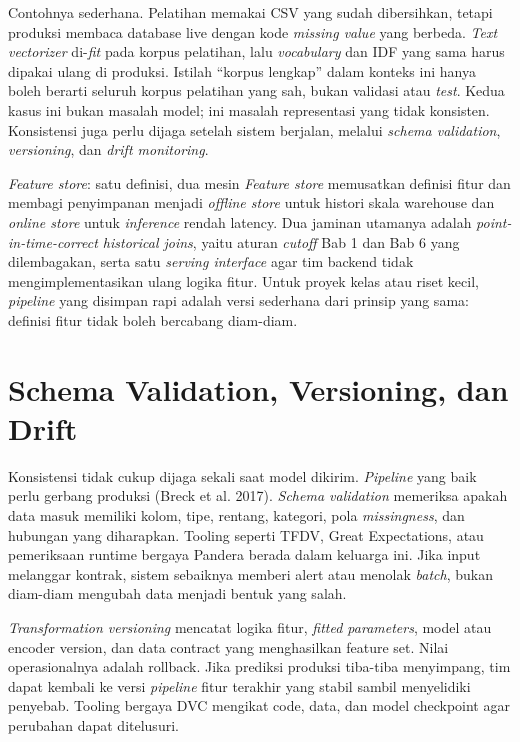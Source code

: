 Contohnya sederhana. Pelatihan memakai CSV yang sudah dibersihkan, tetapi produksi membaca database live dengan kode \emph{missing value} yang berbeda. \emph{Text vectorizer} di-\emph{fit} pada korpus pelatihan, lalu \emph{vocabulary} dan IDF yang sama harus dipakai ulang di produksi. Istilah ``korpus lengkap'' dalam konteks ini hanya boleh berarti seluruh korpus pelatihan yang sah, bukan validasi atau \emph{test}. Kedua kasus ini bukan masalah model; ini masalah representasi yang tidak konsisten. Konsistensi juga perlu dijaga setelah sistem berjalan, melalui \emph{schema validation}, \emph{versioning}, dan \emph{drift monitoring}.

\begin{pendalaman}{\emph{Feature store}: satu definisi, dua mesin}
\emph{Feature store} memusatkan definisi fitur dan membagi penyimpanan menjadi \emph{offline store} untuk histori skala warehouse dan \emph{online store} untuk \emph{inference} rendah latency. Dua jaminan utamanya adalah \emph{point-in-time-correct historical joins}, yaitu aturan \emph{cutoff} Bab 1 dan Bab 6 yang dilembagakan, serta satu \emph{serving interface} agar tim backend tidak mengimplementasikan ulang logika fitur. Untuk proyek kelas atau riset kecil, \emph{pipeline} yang disimpan rapi adalah versi sederhana dari prinsip yang sama: definisi fitur tidak boleh bercabang diam-diam.
\end{pendalaman}

\section{Schema Validation, Versioning, dan Drift}\label{schema-validation-versioning-dan-drift}

Konsistensi tidak cukup dijaga sekali saat model dikirim. \emph{Pipeline} yang baik perlu gerbang produksi (Breck et al. 2017). \emph{Schema validation} memeriksa apakah data masuk memiliki kolom, tipe, rentang, kategori, pola \emph{missingness}, dan hubungan yang diharapkan. Tooling seperti TFDV, Great Expectations, atau pemeriksaan runtime bergaya Pandera berada dalam keluarga ini. Jika input melanggar kontrak, sistem sebaiknya memberi alert atau menolak \emph{batch}, bukan diam-diam mengubah data menjadi bentuk yang salah.

\emph{Transformation versioning} mencatat logika fitur, \emph{fitted parameters}, model atau encoder version, dan data contract yang menghasilkan feature set. Nilai operasionalnya adalah rollback. Jika prediksi produksi tiba-tiba menyimpang, tim dapat kembali ke versi \emph{pipeline} fitur terakhir yang stabil sambil menyelidiki penyebab. Tooling bergaya DVC mengikat code, data, dan model checkpoint agar perubahan dapat ditelusuri.

